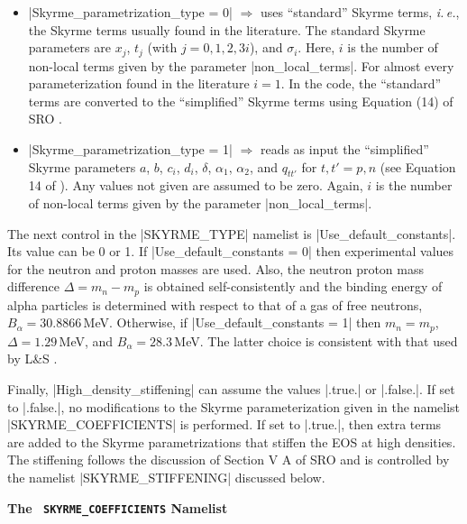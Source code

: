 \documentclass[letterpaper,11pt]{refart}
\newcommand{\LS}{L\&S }
\begin{document}
\begin{itemize}

\item \verbprm|Skyrme_parametrization_type = 0| $\Rightarrow$ uses
  ``standard'' Skyrme terms, \textit{i.\,e.}, the Skyrme terms usually
  found in the literature. The standard Skyrme parameters are $x_j$,
  $t_j$ (with $j=0,1,2,3i$), and $\sigma_i$. Here, $i$ is the number
  of non-local terms given by the parameter
  \verbprm|non_local_terms|. For almost every parameterization found
  in the literature $i=1$. In the code, the ``standard'' terms are
  converted to the ``simplified'' Skyrme terms using Equation (14) of
  SRO \cite{schneider:17}.

\item \verbprm|Skyrme_parametrization_type = 1| $\Rightarrow$ reads as
  input the ``simplified'' Skyrme parameters $a$, $b$, $c_i$, $d_i$,
  $\delta$, $\alpha_1$, $\alpha_2$, and $q_{tt'}$ for $t,t'=p,n$ (see
  Equation 14 of \cite{schneider:17}). Any values not given are
  assumed to be zero. Again, $i$ is the number of non-local terms
  given by the parameter \verbprm|non_local_terms|.

\end{itemize}


The next control in the \verbnml|SKYRME_TYPE| namelist is
\verbprm|Use_default_constants|.  Its value can be 0 or 1.  If \verbprm|Use_default_constants = 0|
then experimental values for the neutron and proton masses are
used.  Also, the neutron proton mass difference $\Delta=m_n-m_p$ is
obtained self-consistently and the binding energy of alpha particles
is determined with respect to that of a gas of free neutrons,
$B_\alpha=30.8866$\,MeV.  Otherwise, if
\verbprm|Use_default_constants = 1| then $m_n=m_p$,
$\Delta=1.29$\,MeV, and $B_\alpha=28.3$\,MeV.  The latter choice is
consistent with that used by \LS \cite{lattimer:91}.


Finally,
\verbprm|High_density_stiffening| can assume the values \verbprm|.true.|
or \verbprm|.false.|.  If set to \verbprm|.false.|, no modifications to
the Skyrme parameterization given in the namelist
\verbnml|SKYRME_COEFFICIENTS| is performed.  If set to
\verbprm|.true.|, then extra terms are added to the Skyrme parametrizations
that stiffen the EOS at high densities.  The stiffening follows the
discussion of Section V A of SRO \cite{schneider:17} and is controlled
by the namelist \verbnml|SKYRME_STIFFENING| discussed below.



\textbf{The \texttt{\color{cyan} SKYRME\_COEFFICIENTS} Namelist}
\end{document}
